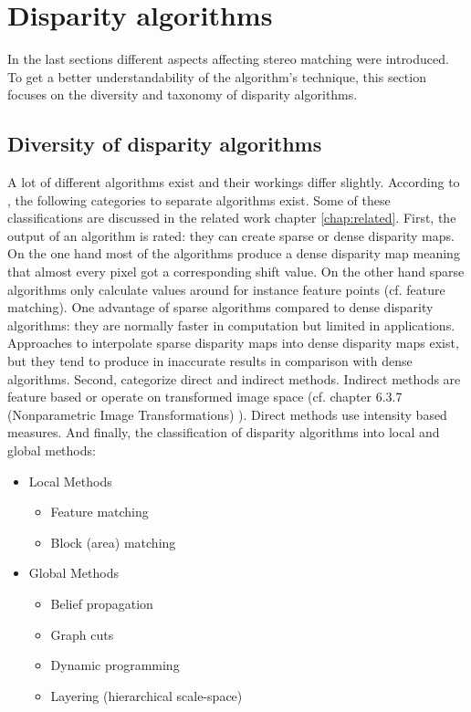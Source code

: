 \section{Disparity algorithms}

In the last sections different aspects affecting stereo matching were introduced.
To get a better understandability of the algorithm's technique, this section focuses on the diversity and taxonomy of disparity algorithms.

\subsection*{Diversity of disparity algorithms}

A lot of different algorithms exist and their workings differ slightly.
According to \citeauthor{cyganek2011introduction, scharstein2002taxonomy}, the following categories to separate algorithms exist.
Some of these classifications are discussed in the related work chapter \ref{chap:related}.
\newline\newline\noindent First, the output of an algorithm is rated: they can create sparse or dense disparity maps.
On the one hand most of the algorithms produce a dense disparity map meaning that almost every pixel got a corresponding shift value.
On the other hand sparse algorithms only calculate values around for instance feature points (cf. feature matching).
One advantage of sparse algorithms compared to dense disparity algorithms: they are normally faster in computation but limited in applications.
Approaches to interpolate sparse disparity maps into dense disparity maps exist, but they tend to produce in inaccurate results in comparison with dense algorithms.
\newline\newline\noindent Second, \citeauthor{cyganek2011introduction} categorize direct and indirect methods.
Indirect methods are feature based or operate on transformed image space (cf. \citeauthor{cyganek2011introduction} chapter 6.3.7 (Nonparametric Image Transformations) \citep{cyganek2011introduction}).
Direct methods use intensity based measures.
\newline\newline\noindent And finally, the classification of disparity algorithms into local and global methods:

\begin{itemize}
  \item Local Methods
  \begin{itemize}
    \item Feature matching
    \item Block (area) matching
  \end{itemize}
  \item Global Methods
  \begin{itemize}
    \item Belief propagation
    \item Graph cuts
    \item Dynamic programming
    \item Layering (hierarchical scale-space)
  \end{itemize}
\end{itemize}


